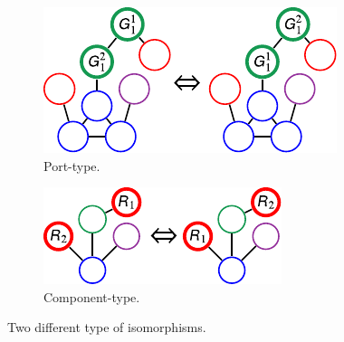 \begin{figure}
\centering
\begin{subfigure}[b]{2.5in}
\centering
\includegraphics[width=\columnwidth]{../ch2/figures/pisopdf}
\caption{Port-type.\label{fig:ch2:piso}}
\end{subfigure}
\hspace{0.25in}
\begin{subfigure}[b]{2.5in}
\centering
\includegraphics[width=\columnwidth]{../ch2/figures/cisopdf}
\caption{Component-type.\label{fig:ch2:ciso}}
\end{subfigure}
\caption{Two different type of isomorphisms.}
\end{figure}